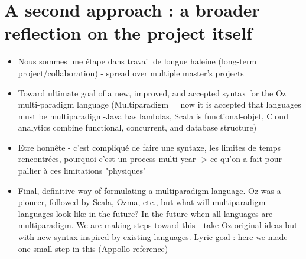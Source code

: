 \section{A second approach : a broader reflection on the project itself}\label{sec:ch4-reflection}
\begin{itemize}
\item Nous sommes une étape dans travail de longue haleine (long-term project/collaboration) - spread over multiple master's projects
\item Toward ultimate goal of a new, improved, and accepted syntax for the Oz multi-paradigm language (Multiparadigm = now it is accepted that languages must be multiparadigm-Java has lambdas, Scala is functional-objet, Cloud analytics combine functional, concurrent, and database structure)
\item Etre honnête - c'est compliqué de faire une syntaxe, les limites de temps rencontrées, pourquoi c'est un process multi-year -> ce qu'on a fait pour pallier à ces limitations "physiques"
\item Final, definitive way of formulating a multiparadigm language.  Oz was a pioneer, followed by Scala, Ozma, etc., but what will multiparadigm languages look like in the future?  In the future when all languages are multiparadigm. We are making steps toward this - take Oz original ideas but with new syntax inspired by existing languages. Lyric goal : here we made one small step in this (Appollo reference)
\end{itemize}
